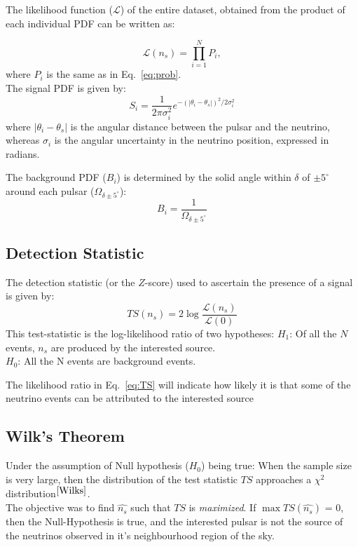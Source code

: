 \documentclass{article}
\begin{document}
The likelihood function ($\mathcal{L}$) of the entire
dataset, obtained from the product of each individual PDF can be written as:

\begin{equation}
	\mathcal{L} (n_s) = \prod_{i=1}^N P_i,
\end{equation}
where $P_i$ is the same as in Eq.~\ref{eq:prob}.\\
 The signal PDF is given by:
\begin{equation}
S_i = \frac{1}{2\pi\sigma_i^2}e^{-(|\theta_i-\theta_s|)^2/2\sigma_i^2}
\label{eq:S}
\end{equation}
where $|\theta_i-\theta_s|$ is the angular distance between the  pulsar and the neutrino, whereas $\sigma_i$ is the angular uncertainty in the neutrino position, expressed in radians. 

The background PDF ($B_i$) is determined by the solid angle within  $\delta$ of $\pm 5^{\circ}$ around each pulsar ($\Omega_{\delta \pm 5^{\circ}}$):
\begin{equation}
B_i=\frac{1}{\Omega_{\delta \pm 5^{\circ}}}
\end{equation}
\subsection{\large Detection Statistic}

 The detection statistic (or the $Z$-score) used to ascertain the presence of a signal is given by:
\begin{equation}
TS (n_s) = 2 \log \frac{\mathcal{L} (n_s)}{\mathcal{L} (0)}
\label{eq:TS}
\end{equation}
This test-statistic is the log-likelihood ratio of two hypotheses: $H_1$: Of all the $N$ events, $n_s$ are produced by the interested source. \\
$H_0$: All the N events are background events.

The likelihood ratio in Eq.~\ref{eq:TS} will indicate how likely it is that some of the neutrino events can be attributed to the interested source %

\subsection{\large Wilk's Theorem}
Under the assumption of Null hypothesis ($H_0$) being true:
When the sample size is very large, then the distribution of the test statistic $TS$ approaches a $\chi^2$ distribution$^{\cite{Wilks}}$.\\
The objective was to find $\hat{n_s}$ such that $TS$ is \emph{maximized}. If $\max{TS(\hat{n_s})}$ = 0, then the Null-Hypothesis is true, and the interested pulsar is not the source of the neutrinos observed in it's neighbourhood region of the sky.
\end{document}
